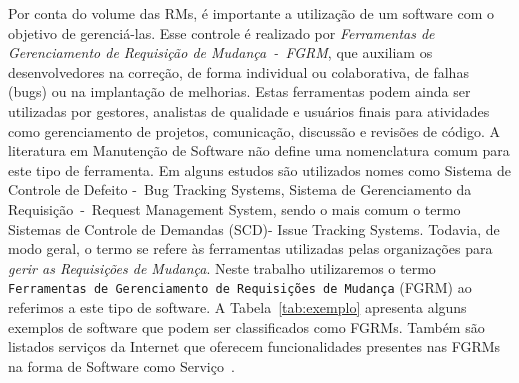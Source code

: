 Por conta do volume das RMs, é importante a utilização de um software com o
objetivo de gerenciá-las. Esse controle é realizado por \textit{Ferramentas de
    Gerenciamento de Requisição de Mudança~-~FGRM}, que auxiliam os
desenvolvedores na correção, de forma individual ou colaborativa, de falhas
(bugs) ou na implantação de melhorias. Estas ferramentas podem ainda ser
utilizadas por gestores, analistas de qualidade e usuários finais para
atividades como gerenciamento de projetos, comunicação, discussão e revisões de
código. A literatura em Manutenção de Software não define uma nomenclatura comum
para este tipo de ferramenta. Em alguns estudos são utilizados nomes como
Sistema de Controle de Defeito -~Bug Tracking Systems, Sistema de Gerenciamento
da Requisição~-~Request Management System, sendo o mais comum o termo Sistemas
de Controle de Demandas (SCD)- Issue Tracking Systems. Todavia, de modo geral, o
termo se refere às ferramentas utilizadas pelas organizações para \textit{gerir
    as Requisições de Mudança}. Neste trabalho utilizaremos o termo
\texttt{Ferramentas de Gerenciamento de Requisições de Mudança} (FGRM) ao
referimos a este tipo de software. A Tabela~\ref{tab:exemplo} apresenta alguns
exemplos de software que podem ser classificados como FGRMs. Também são listados
serviços da Internet que oferecem funcionalidades presentes nas FGRMs na forma
de Software como Serviço~\cite{fox2013engineering}.

\begin{table}[htpb]
\centering
{}
\caption{Exemplos de ferramentas e serviços da Internet que podem ser
    classificados como FGRMs. Extraído de~\cite{cavalcanti2014challenges}}
\label{tab:exemplo}
\end{table}

